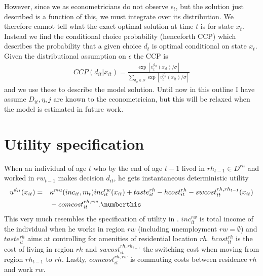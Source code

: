 However, since we as econometricians do not observe $\epsilon_t$, but the solution just described is a function of this, we must integrate over its distribution. We therefore cannot tell what the exact optimal solution at time $t$ is for state $x_t$. Instead we find the conditional choice probability (henceforth CCP) which describes the probability that a given choice $d_t$ is optimal conditional on state $x_t$. Given the distributional assumption on $\epsilon$ the CCP is
\begin{align}
CCP(d_{it}|x_{it})=\frac{\exp[v_t^{d_{it}}(x_{it})/ \sigma]}{\sum_{d_{it} \in D} { \exp[v_t^{d_{it}}(x_{it})/ \sigma]  }}
\end{align}
and we use these to describe the model solution. Until now in this outline I have assume $D_{it},\eta,j$ are known to the econometrician, but this will be relaxed when the model is estimated in future work.

\section{Utility specification}
When an individual of age $t$ who by the end of age $t-1$ lived in $rh_{t-1}\in D^{rh}$ and worked in $rw_{t-1}$ makes decision $d_{it}$, he gets instantaneous deterministic utility
\begin{alignat*}{3}
&u^{d_{it}}(x_{it})=&&\kappa^{mu}(inc_{it},m_t){inc_{it}^{rw}}(x_{it})+taste_{it}^{rh}-hcost_{it}^{rh}-swcost_{it}^{rh,rh_{t-1}}(x_{it}) \\
& &&-comcost_{it}^{rh,rw}. \label{eq:u} \numberthis 
\end{alignat*}
This very much resembles the specification of utility in \citet{Buchinsky2014}. $inc_{it}^{rw}$ is total income of the individual when he works in region $rw$ (including unemployment $rw=\emptyset$) and $taste_{it}^{rh}$ aims at controlling for amenities of residential location $rh$. $hcost_{it}^{rh}$ is the cost of living in region $rh$ and $swcost_{it}^{rh,rh_{t-1}}$ the switching cost when moving from region $rh_{t-1}$ to $rh$. Lastly, $comcost_{it}^{rh,rw}$ is commuting costs between residence $rh$ and work $rw$. 

